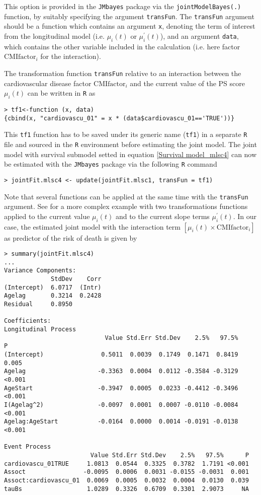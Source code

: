 \documentclass[12pt]{article}
\begin{document}
This option is provided in the \texttt{JMbayes} package via the \texttt{jointModelBayes(.)} function, by suitably specifying the argument \texttt{transFun}. The \texttt{transFun} argument should be a function which contains an argument \texttt{x}, denoting the term of interest from the longitudinal model (i.e. $\mu_i(t)$ or $\mu_i^{'}(t)$), and an
argument \texttt{data}, which contains the other variable included in the calculation (i.e. here factor $\text{CMIfactor}_i$ for the interaction). 

The transformation function \texttt{transFun} relative to an interaction between the cardiovascular disease factor $\text{CMIfactor}_i$ and the current value of the PS score $\mu_i(t)$ can be written in \texttt{R} as
\begin{verbatim}
> tf1<-function (x, data) 
{cbind(x, "cardiovascu_01" = x * (data$cardiovascu_01=='TRUE'))}
\end{verbatim}
This \texttt{tf1} function has to be saved under its generic name (\texttt{tf1}) in a separate \texttt{R} file and sourced in the \texttt{R} environment before estimating the joint model.
The joint model with survival submodel setted in equation \eqref{Survival model_mlsc4} can now be estimated with the \texttt{JMbayes} package via the following \texttt{R} command
\begin{verbatim}
> jointFit.mlsc4 <- update(jointFit.mlsc1, transFun = tf1)
\end{verbatim}
Note that several functions can be applied at the same time with the \texttt{transFun} argument. See \cite{JMbayes} for a more complex example with two transformations functions applied to the current value $\mu_i(t)$ and to the current slope terms $\mu_i^{'}(t)$.
In our case, the estimated joint model with the interaction term $[\mu_i(t) \times \text{CMIfactor}_i]$ as predictor of the risk of death is given by
\begin{verbatim}
> summary(jointFit.mlsc4)
...
Variance Components:
             StdDev    Corr
(Intercept)  6.0717  (Intr)
Agelag       0.3214  0.2428
Residual     0.8950        

Coefficients:
Longitudinal Process
                            Value Std.Err Std.Dev    2.5%   97.5%      P
(Intercept)                0.5011  0.0039  0.1749  0.1471  0.8419  0.005
Agelag                    -0.3363  0.0004  0.0112 -0.3584 -0.3129 <0.001
AgeStart                  -0.3947  0.0005  0.0233 -0.4412 -0.3496 <0.001
I(Agelag^2)               -0.0097  0.0001  0.0007 -0.0110 -0.0084 <0.001
Agelag:AgeStart           -0.0164  0.0000  0.0014 -0.0191 -0.0138 <0.001

Event Process
                        Value Std.Err Std.Dev    2.5%   97.5%      P
cardiovascu_01TRUE     1.0813  0.0544  0.3325  0.3782  1.7191 <0.001
Assoct                -0.0095  0.0006  0.0031 -0.0155 -0.0031  0.001
Assoct:cardiovascu_01  0.0069  0.0005  0.0032  0.0004  0.0130  0.039
tauBs                  1.0289  0.3326  0.6709  0.3301  2.9073     NA

\end{verbatim}
\end{document}

